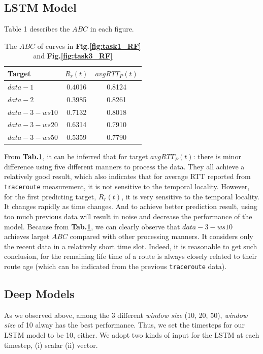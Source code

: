 \documentclass[sigconf]{acmart}
\begin{document}
	
	\subsection{LSTM Model}
	
	
	Table 1 describes the $ABC$ in each figure.
	\begin{table}[tbp]
		\centering  
		\begin{tabular}{lcc} 
			\hline
			Target &$R_r(t)$ &$avgRTT_P(t)$ \\ \hline
			$data-1$ & 0.4016    &0.8124   \\        
			$data-2$ &0.3985 &0.8261 \\        
			$data-3-ws10$  &0.7132 &0.8018 \\
			$data-3-ws20$ &0.6314 &0.7910 \\
			$data-3-ws50$ &0.5359  &0.7790 \\ \hline
		\end{tabular}
		\caption{The $ABC$ of curves
			in \textbf{Fig.\ref{fig:task1_RF}} and \textbf{Fig.\ref{fig:task3_RF}} }
		\label{tab:result_RF}
	\end{table}
	From \textbf{Tab.\ref{tab:result_RF}}, it can be inferred that for target $avgRTT_P(t)$: there is minor difference using five different manners to process the data. They all achieve a relatively good result, which also indicates that for average RTT reported from \texttt{traceroute} measurement, it is not sensitive to the temporal locality. However, for the first predicting target, $R_r(t)$, it is very sensitive to the temporal locality. It changes rapidly as time changes. And to achieve better prediction result, using too much previous data will result in noise and decrease the performance of the model. Because from \textbf{Tab.\ref{tab:result_RF}}, we can clearly observe that $data-3-ws10$ achieves larget $ABC$ compared with other processing manners. It considers only the recent data in a relatively short time slot. Indeed, it is reasonable to get such conclusion, for the remaining life time of a route is always closely related to their route age (which can be indicated from the previous \texttt{traceroute} data).
	\subsection{Deep Models}
	
	As we observed above, among the 3 different \textit{window size} (10, 20, 50), \textit{window size} of 10 alway has the best performance. Thus, we set the timesteps for our LSTM model to be 10, either.  We adopt two kinds of input for the LSTM at each timestep, (i) scalar (ii) vector.
\end{document}

